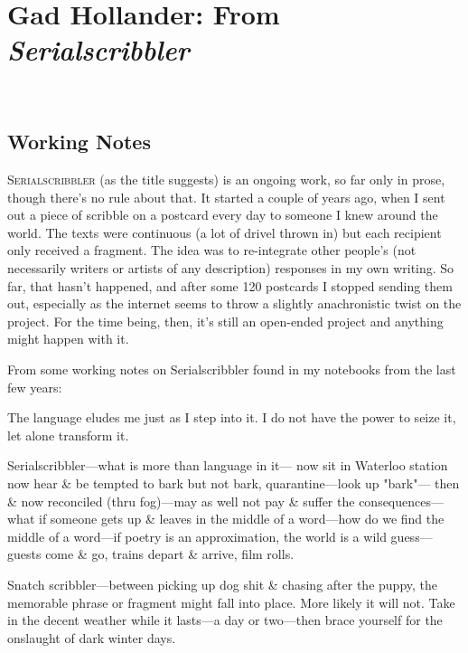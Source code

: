 \documentclass[
]{memoir}
\begin{document}
\hypertarget{gad-hollander-from-serialscribbler}{%
\chapter{\texorpdfstring{Gad Hollander: From
\emph{Serialscribbler}}{Gad Hollander: From Serialscribbler}}\label{gad-hollander-from-serialscribbler}}

~

\hypertarget{working-notes-4}{%
\section*{Working Notes}\label{working-notes-4}}

\lettrine[lines=3, findent=0em, nindent=0.1em, lhang=0]{S}{erialscribbler}
(as the title suggests) is an ongoing work, so far only in prose, though
there's no rule about that. It started a couple of years ago, when I
sent out a piece of scribble on a postcard every day to someone I knew
around the world. The texts were continuous (a lot of drivel thrown in)
but each recipient only received a fragment. The idea was to
re-integrate other people's (not necessarily writers or artists of any
description) responses in my own writing. So far, that hasn't happened,
and after some 120 postcards I stopped sending them out, especially as
the internet seems to throw a slightly anachronistic twist on the
project. For the time being, then, it's still an open-ended project and
anything might happen with it.

From some working notes on Serialscribbler found in my notebooks from
the last few years:

The language eludes me just as I step into it. I do not have the power
to seize it, let alone transform it.

Serialscribbler---what is more than language in it--- now sit in
Waterloo station now hear \& be tempted to bark but not bark,
quarantine---look up "bark"--- then \& now reconciled (thru fog)---may
as well not pay \& suffer the consequences---what if someone gets up \&
leaves in the middle of a word---how do we find the middle of a
word---if poetry is an approximation, the world is a wild guess---guests
come \& go, trains depart \& arrive, film rolls.

Snatch scribbler---between picking up dog shit \& chasing after the
puppy, the memorable phrase or fragment might fall into place. More
likely it will not. Take in the decent weather while it lasts---a day or
two---then brace yourself for the onslaught of dark winter days.
\end{document}
